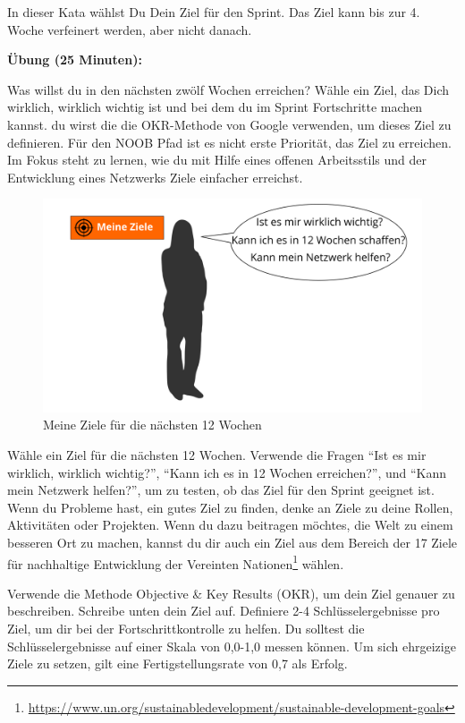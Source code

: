 \documentclass[
  ngerman,
  paper=a4,
,captions=tableheading
]{scrartcl}
\DeclareRobustCommand{\href}[2]{#2\footnote{\url{#1}}}
\begin{document}
In dieser Kata wählst Du Dein Ziel für den Sprint. Das Ziel kann bis zur
4. Woche verfeinert werden, aber nicht danach.

\textbf{Übung (25 Minuten):}

Was willst du in den nächsten zwölf Wochen erreichen? Wähle ein Ziel,
das Dich wirklich, wirklich wichtig ist und bei dem du im Sprint
Fortschritte machen kannst. du wirst die die OKR-Methode von Google
verwenden, um dieses Ziel zu definieren. Für den NOOB Pfad ist es nicht
erste Priorität, das Ziel zu erreichen. Im Fokus steht zu lernen, wie du
mit Hilfe eines offenen Arbeitsstils und der Entwicklung eines Netzwerks
Ziele einfacher erreichst.

\begin{figure}
\centering
\includegraphics{./tex2pdf.-af94b87e0fdb9aa6/72ba80282397e2812427b590dec7eedfe5393f0e.png}
\caption{Meine Ziele für die nächsten 12 Wochen}
\end{figure}

Wähle ein Ziel für die nächsten 12 Wochen. Verwende die Fragen ``Ist es
mir wirklich, wirklich wichtig?'', ``Kann ich es in 12 Wochen
erreichen?'', und ``Kann mein Netzwerk helfen?'', um zu testen, ob das
Ziel für den Sprint geeignet ist. Wenn du Probleme hast, ein gutes Ziel
zu finden, denke an Ziele zu deine Rollen, Aktivitäten oder Projekten.
Wenn du dazu beitragen möchtes, die Welt zu einem besseren Ort zu
machen, kannst du dir auch ein Ziel aus dem Bereich der
\href{https://www.un.org/sustainabledevelopment/sustainable-development-goals}{17
Ziele für nachhaltige Entwicklung der Vereinten Nationen} wählen.

Verwende die Methode Objective \& Key Results (OKR), um dein Ziel
genauer zu beschreiben. Schreibe unten dein Ziel auf. Definiere 2-4
Schlüsselergebnisse pro Ziel, um dir bei der Fortschrittkontrolle zu
helfen. Du solltest die Schlüsselergebnisse auf einer Skala von 0,0-1,0
messen können. Um sich ehrgeizige Ziele zu setzen, gilt eine
Fertigstellungsrate von 0,7 als Erfolg.
\end{document}
